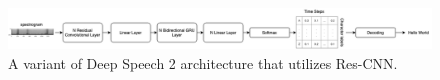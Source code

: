 
\begin{figure}[!t]
    \centering
    \includegraphics[width=\linewidth]{img/speech.png}
    \caption{A variant of Deep Speech 2 architecture that utilizes Res-CNN.}
    \label{fig:deepSpeech}
    \vspace{-10pt}
\end{figure}

